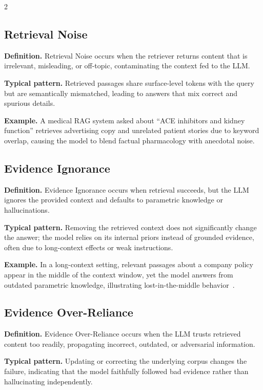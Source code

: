 \documentclass[11pt,a4paper]{article}
\begin{document}
\begin{multicols}{2}
\subsection{Retrieval Noise}

\textbf{Definition.} Retrieval Noise occurs when the retriever returns content that is irrelevant, misleading, or off-topic, contaminating the context fed to the LLM.

\textbf{Typical pattern.} Retrieved passages share surface-level tokens with the query but are semantically mismatched, leading to answers that mix correct and spurious details.

\textbf{Example.} A medical RAG system asked about ``ACE inhibitors and kidney function'' retrieves advertising copy and unrelated patient stories due to keyword overlap, causing the model to blend factual pharmacology with anecdotal noise.

\subsection{Evidence Ignorance}

\textbf{Definition.} Evidence Ignorance occurs when retrieval succeeds, but the LLM ignores the provided context and defaults to parametric knowledge or hallucinations.

\textbf{Typical pattern.} Removing the retrieved context does not significantly change the answer; the model relies on its internal priors instead of grounded evidence, often due to long-context effects or weak instructions.

\textbf{Example.} In a long-context setting, relevant passages about a company policy appear in the middle of the context window, yet the model answers from outdated parametric knowledge, illustrating lost-in-the-middle behavior~\cite{liu2024lost}.

\subsection{Evidence Over-Reliance}

\textbf{Definition.} Evidence Over-Reliance occurs when the LLM trusts retrieved content too readily, propagating incorrect, outdated, or adversarial information.

\textbf{Typical pattern.} Updating or correcting the underlying corpus changes the failure, indicating that the model faithfully followed bad evidence rather than hallucinating independently.


\end{multicols}
\end{document}
